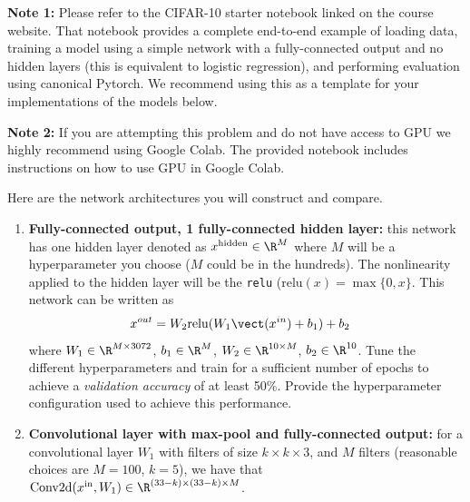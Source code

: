 \documentclass{article}
\begin{document}
\begin{aprob}
\medskip

\textcolor{red!80!black}{\textbf{Note 1:}} Please refer to the CIFAR-10 starter notebook linked on the course website. That notebook provides a complete end-to-end example of loading data, training a model using a simple network with a fully-connected output and no hidden layers (this is equivalent to logistic regression), and performing evaluation using canonical Pytorch. We recommend using this as a template for your implementations of the models below. 

\textcolor{red!80!black}{\textbf{Note 2:}} If you are attempting this problem and do not have access to GPU we highly recommend using Google Colab. The provided notebook includes instructions on how to use GPU in Google Colab.

\vspace{0.1in}
Here are the network architectures you will construct and compare. 
\begin{enumerate}
  \item {} \textbf{Fully-connected output, 1 fully-connected hidden layer:} this network has one hidden layer denoted as $x^\text{hidden} \in \R^{M}$ where $M$ will be a hyperparameter you choose ($M$ could be in the hundreds). The nonlinearity applied to the hidden layer will be the \texttt{relu} ($\mathrm{relu}(x) = \max\{0,x\}$. This network can be written as
  \begin{align*}
    x^{out} &= W_2 \mathrm{relu}(W_1 \vect(x^{in}) +b_1) + b_2
  \end{align*}
  where $W_1 \in \R^{M \times 3072}$, $b_1 \in \R^M$, $W_2 \in \R^{10 \times M}$, $b_2 \in \R^{10}$.
  Tune the different hyperparameters and train for a sufficient number of epochs to achieve a \emph{validation accuracy} of at least 50\%. Provide the hyperparameter configuration used to achieve this performance.
  \item {} \textbf{Convolutional layer with max-pool and fully-connected output:} for a convolutional layer $W_1$ with filters of size $k \times k \times 3$, and $M$ filters (reasonable choices are $M=100$, $k=5$), we have that $\mathrm{Conv2d}(x^\text{in}, W_1) \in \R^{(33-k) \times (33-k) \times M}$.
  

\end{enumerate}
\end{aprob}
\end{document}
